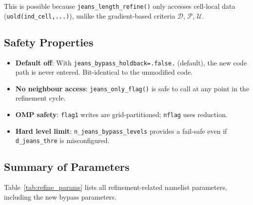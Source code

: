 \documentclass[fleqn,usenatbib]{mnras}
\newcommand{\code}[1]{\texttt{#1}}
\begin{document}
This is possible because \code{jeans\_length\_refine()} only accesses
cell-local data (\code{uold(ind\_cell,...)}), unlike the gradient-based
criteria $\mathcal{D}$, $\mathcal{P}$, $\mathcal{U}$.

\subsection{Safety Properties}

\begin{itemize}
  \item \textbf{Default off}: With
    \code{jeans\_bypass\_holdback=.false.} (default), the new code path
    is never entered.  Bit-identical to the unmodified code.
  \item \textbf{No neighbour access}: \code{jeans\_only\_flag()} is
    safe to call at any point in the refinement cycle.
  \item \textbf{OMP safety}: \code{flag1} writes are grid-partitioned;
    \code{nflag} uses reduction.
  \item \textbf{Hard level limit}: \code{n\_jeans\_bypass\_levels}
    provides a fail-safe even if \code{d\_jeans\_thre} is misconfigured.
\end{itemize}


\subsection{Summary of Parameters}
\label{sec:params}

Table~\ref{tab:refine_params} lists all refinement-related
namelist parameters, including the new bypass parameters.
\end{document}

